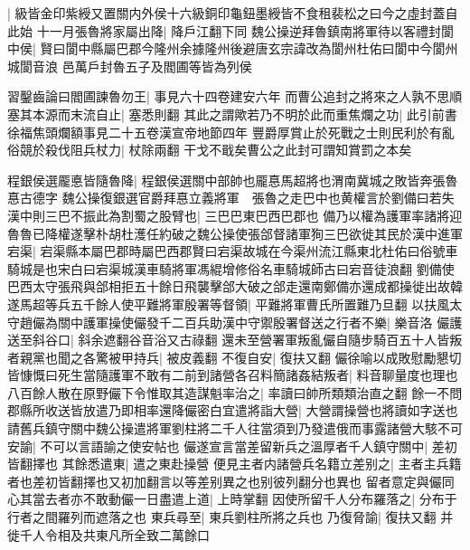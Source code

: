 |{
	級皆金印紫綬又置關内外侯十六級銅印龜鈕墨綬皆不食租裴松之曰今之虛封蓋自此始}
十一月張魯將家屬出降|{
	降戶江翻下同}
魏公操逆拜魯鎮南將軍待以客禮封閬中侯|{
	賢曰閬中縣屬巴郡今隆州余據隆州後避唐玄宗諱改為閬州杜佑曰閬中今閬州城閬音浪}
邑萬戶封魯五子及閻圃等皆為列侯

習鑿齒論曰閻圃諫魯勿王|{
	事見六十四卷建安六年}
而曹公追封之將來之人孰不思順塞其本源而末流自止|{
	塞悉則翻}
其此之謂歟若乃不明於此而重焦爛之功|{
	此引前書徐福焦頭爛額事見二十五卷漢宣帝地節四年}
豐爵厚賞止於死戰之士則民利於有亂俗競於殺伐阻兵杖力|{
	杖除兩翻}
干戈不戢矣曹公之此封可謂知賞罰之本矣

程銀侯選龎悳皆隨魯降|{
	程銀侯選關中部帥也龎惪馬超將也渭南冀城之敗皆奔張魯惪古德字}
魏公操復銀選官爵拜惪立義將軍　張魯之走巴中也黄權言於劉備曰若失漢中則三巴不振此為割蜀之股臂也|{
	三巴巴東巴西巴郡也}
備乃以權為護軍率諸將迎魯魯已降權遂擊朴胡杜濩任約破之魏公操使張郃督諸軍狥三巴欲徙其民於漢中進軍宕渠|{
	宕渠縣本屬巴郡時屬巴西郡賢曰宕渠故城在今渠州流江縣東北杜佑曰俗號車騎城是也宋白曰宕渠城漢車騎將軍馮緄增修俗名車騎城師古曰宕音徒浪翻}
劉備使巴西太守張飛與郃相拒五十餘日飛襲擊郃大破之郃走還南鄭備亦還成都操徙出故韓遂馬超等兵五千餘人使平難將軍殷署等督領|{
	平難將軍曹氏所置難乃旦翻}
以扶風太守趙儼為關中護軍操使儼發千二百兵助漢中守禦殷署督送之行者不樂|{
	樂音洛}
儼護送至斜谷口|{
	斜余遮翻谷音浴又古祿翻}
還未至營署軍叛亂儼自隨步騎百五十人皆叛者親黨也聞之各驚被甲持兵|{
	被皮義翻}
不復自安|{
	復扶又翻}
儼徐喻以成敗慰勵懇切皆慷慨曰死生當隨護軍不敢有二前到諸營各召料簡諸姦結叛者|{
	料音聊量度也理也}
八百餘人散在原野儼下令惟取其造謀魁率治之|{
	率讀曰帥所類類治直之翻}
餘一不問郡縣所收送皆放遣乃即相率還降儼密白宜遣將詣大營|{
	大營謂操營也將讀如字送也}
請舊兵鎮守關中魏公操遣將軍劉柱將二千人往當須到乃發遣俄而事露諸營大駭不可安諭|{
	不可以言語諭之使安帖也}
儼遂宣言當差留新兵之溫厚者千人鎮守關中|{
	差初皆翻擇也}
其餘悉遣東|{
	遣之東赴操營}
便見主者内諸營兵名籍立差别之|{
	主者主兵籍者也差初皆翻擇也又初加翻言以等差别異之也别彼列翻分也異也}
留者意定與儼同心其當去者亦不敢動儼一日盡遣上道|{
	上時掌翻}
因使所留千人分布羅落之|{
	分布于行者之間羅列而遮落之也}
東兵尋至|{
	東兵劉柱所將之兵也}
乃復脅諭|{
	復扶又翻}
并徙千人令相及共東凡所全致二萬餘口

